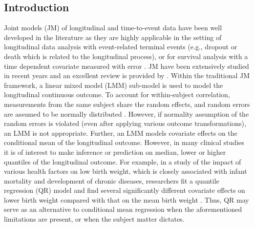 





% 


\subsection{Introduction}
Joint models (JM) of longitudinal and time-to-event data have been well developed in the literature as they are highly applicable in the setting of longitudinal data analysis with event-related terminal events (e.g., dropout or death which is related to the longitudinal process), or for survival analysis with a time dependent covariate measured with error \citep{self1992modeling, tsiatis1995modeling}. JM have been extensively studied in recent years and an excellent review is provided by \cite{tsiatis2004joint}. %
Within the traditional JM framework, a linear mixed model (LMM) sub-model is used to model the longitudinal continuous outcome. To account for within-subject correlation, measurements from the same subject share the random effects, and random errors are assumed to be normally distributed \citep{laird1982random}. However, if normality assumption of the random errors is violated (even after applying various outcome transformations), an LMM is not appropriate. Further, an LMM  models covariate effects on the conditional mean of the longitudinal outcome. However, in many clinical studies it is of interest to make inference or prediction on median, lower or higher quantiles of the longitudinal outcome. For example, in a study of the impact of various health factors on low birth weight, which is closely associated with infant mortality and development of chronic diseases, researchers fit a quantile regression (QR) model and find several significantly different covariate effects on lower birth weight compared with that on the mean birth weight \citep{koenker2001quantile}. Thus, QR may serve as an alternative to conditional mean regression when the aforementioned limitations are present, or when the subject matter dictates.

